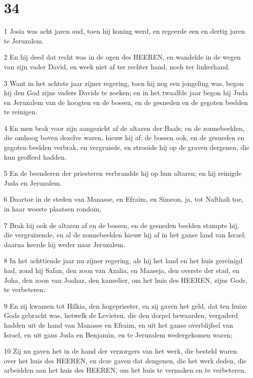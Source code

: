 \chapter{34}

\par 1 Josia was acht jaren oud, toen hij koning werd, en regeerde een en dertig jaren te Jeruzalem.
\par 2 En hij deed dat recht was in de ogen des HEEREN, en wandelde in de wegen van zijn vader David, en week niet af ter rechter hand, noch ter linkerhand.
\par 3 Want in het achtste jaar zijner regering, toen hij nog een jongeling was, begon hij den God zijns vaders Davids te zoeken; en in het twaalfde jaar begon hij Juda en Jeruzalem van de hoogten en de bossen, en de gesneden en de gegoten beelden te reinigen.
\par 4 En men brak voor zijn aangezicht af de altaren der Baals; en de zonnebeelden, die omhoog boven dezelve waren, hieuw hij af; de bossen ook, en de gesneden en gegoten beelden verbrak, en vergruisde, en strooide hij op de graven dergenen, die hun geofferd hadden.
\par 5 En de beenderen der priesteren verbrandde hij op hun altaren; en hij reinigde Juda en Jeruzalem.
\par 6 Daartoe in de steden van Manasse, en Efraim, en Simeon, ja, tot Nafthali toe, in haar woeste plaatsen rondom,
\par 7 Brak hij ook de altaren af en de bossen, en de gesneden beelden stampte hij, die vergruizende, en al de zonnebeelden hieuw hij af in het ganse land van Israel; daarna keerde hij weder naar Jeruzalem.
\par 8 In het achttiende jaar nu zijner regering, als hij het land en het huis gereinigd had, zond hij Safan, den zoon van Azalia, en Maaseja, den overste der stad, en Joha, den zoon van Joahaz, den kanselier, om het huis des HEEREN, zijns Gods, te verbeteren.
\par 9 En zij kwamen tot Hilkia, den hogepriester, en zij gaven het geld, dat ten huize Gods gebracht was, hetwelk de Levieten, die den dorpel bewaarden, vergaderd hadden uit de hand van Manasse en Efraim, en uit het ganse overblijfsel van Israel, en uit gans Juda en Benjamin, en te Jeruzalem wedergekomen waren;
\par 10 Zij nu gaven het in de hand der verzorgers van het werk, die besteld waren over het huis des HEEREN, en deze gaven dat dengenen, die het werk deden, die arbeidden aan het huis des HEEREN, om het huis te vermaken en te verbeteren.

